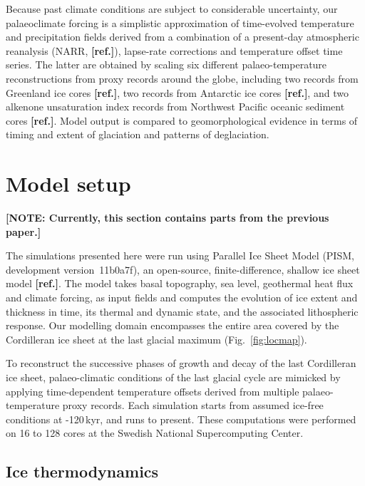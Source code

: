 \documentclass[tc, ms]{copernicus}
\newcommand{\note}[1]{\textbf{[NOTE: #1]}}
\newcommand{\aref}[0]{\textbf{[ref.]}}
\begin{document}
Because past climate conditions are subject to considerable uncertainty, our
palaeoclimate forcing is a simplistic approximation of time-evolved temperature
and precipitation fields derived from a combination of a present-day
atmospheric reanalysis (NARR, \aref), lapse-rate corrections and temperature offset
time series. The latter are
obtained by scaling six different palaeo-temperature reconstructions from
proxy records around the globe, including two  records from
Greenland ice cores \aref, two  records from Antarctic ice cores \aref,
and two alkenone unsaturation index records from Northwest Pacific oceanic
sediment cores \aref. Model output is compared to geomorphological evidence in terms
of timing and extent of glaciation and patterns of deglaciation.


\section{Model setup}
\label{sec:model}

\note{Currently, this section contains parts from the previous paper.}

The simulations presented here were run using Parallel Ice Sheet Model (PISM,
development version~11b0a7f), an open-source, finite-difference, shallow ice
sheet model \aref. The model takes basal topography, sea level, geothermal heat flux
and climate forcing, as input fields and computes the evolution of ice extent
and thickness in time, its thermal and dynamic state, and
the associated lithospheric response. Our modelling domain encompasses the
entire area covered by the Cordilleran ice sheet at the last glacial maximum
(Fig.~\ref{fig:locmap}).

To reconstruct the successive phases of growth and decay of the last Cordilleran
ice sheet, palaeo-climatic conditions of the last glacial cycle are mimicked
by applying time-dependent temperature offsets derived from multiple
palaeo-temperature proxy records. Each simulation starts from assumed ice-free
conditions at -120\,kyr, and runs to present. These computations were
performed on 16 to 128 cores at the Swedish National Supercomputing
Center.

\subsection{Ice thermodynamics}
\end{document}
